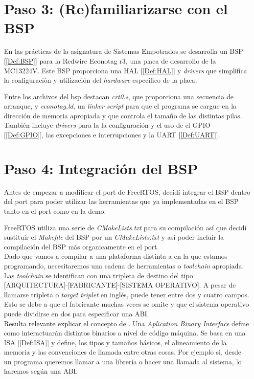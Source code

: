 
\section{Paso 3: (Re)familiarizarse con el BSP}
En las prácticas de la asignatura de Sistemas Empotrados se desarrolla un BSP [\ref{Def:BSP}] para la Redwire Econotag r3, una placa de desarrollo de la MC13224V. Este BSP proporciona una HAL [\ref{Def:HAL}] y \emph{drivers} que simplifica la configuración y utilización del \emph{hardware} específico de la placa.

Entre los archivos del bsp destacan \emph{crt0.s}, que proporciona una secuencia de arranque, y \emph{econotag.ld}, un \emph{linker script} para que el programa se cargue en la dirección de memoria apropiada y que controla el tamaño de las distintas pilas.
También incluye \emph{drivers} para la la configuración y el uso de el GPIO [\ref{Def:GPIO}], las excepciones e interrupciones y la UART [\ref{Def:UART}].

\section{Paso 4: Integración del BSP}
\label{chap:IntegraciónBSP}

Antes de empezar a modificar el port de FreeRTOS, decidí integrar el BSP dentro del port para poder utilizar las herramientas que ya implementadas en el BSP tanto en el port como en la demo.

FreeRTOS utiliza una serie de \emph{CMakeLists.txt} para su compilación así que decidí sustituir el \emph{Makefile} del BSP por un \emph{CMakeLists.txt} y así poder incluir la compilación del BSP más organicamente en el port.\\

Dado que vamos a compilar a una plataforma distinta a en la que estamos programando, necesitaremos una cadena de herramientas o \emph{toolchain} apropiada. Las \emph{toolchain} se identifican con una tripleta de destino del tipo [ARQUITECTURA]-[FABRICANTE]-[SISTEMA OPERATIVO]. A pesar de llamarse tripleta o \emph{target triplet} en inglés, puede tener entre dos y cuatro campos. Esto se debe a que el fabricante muchas veces se omite y que el sistema operativo puede dividirse en dos para especificar una ABI.\\

Resulta relevante explicar el concepto de . Una \emph{Aplication Binary Interface} define como interactuarán distintos binarios a nivel de código máquina. Se basa en una ISA [\ref{Def:ISA}] y define, los tipos y tamaños básicos, el alineamiento de la memoria y las convenciones de llamada entre otras cosas.
Por ejemplo si, desde un programa queremos llamar a una librería o hacer una llamada al sistema, lo haremos según una ABI.\\

